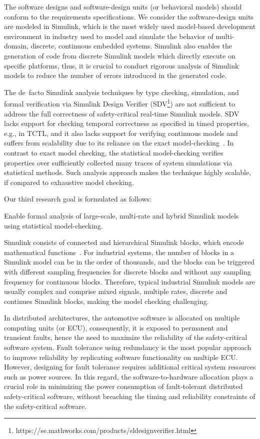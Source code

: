 The software designs and software-design units (or behavioral models) should conform to the requirements specifications. We consider the software-design units are modeled in Simulink, which is the most widely used model-based development environment in industry used to model and simulate the behavior of multi-domain, discrete, continuous embedded systems. Simulink also enables the generation of code from discrete Simulink models which directly execute on specific platforms, thus, it is crucial to conduct rigorous analysis of Simulink models to reduce the number of errors introduced in the generated code.

The de~facto Simulink analysis techniques by type checking, simulation, and formal verification via Simulink Design Verifier (SDV\footnote{https://se.mathworks.com/products/sldesignverifier.html}) are not sufficient to address the full correctness of safety-critical real-time Simulink models. SDV lacks support for checking temporal correctness as specified in timed properties, e.g., in TCTL, and it also lacks support for verifying continuous models and suffers from scalability due to its reliance on the exact model-checking~\cite{Leitner2008SimulinkStudy}. In contrast to exact model checking, the statistical model-checking verifies properties over sufficiently collected many traces of system simulations via statistical methods. Such analysis approach makes the technique highly scalable, if compared to exhaustive model checking.  

Our third research goal is formulated as follows:
\begin{researchgoal}
Enable formal analysis of large-scale, multi-rate and hybrid Simulink models using statistical model-checking.
\end{researchgoal}

Simulink consists of connected and hierarchical Simulink blocks, which encode mathematical functions~\cite{JamesB.Dabney2003MasteringSimulink}. For industrial systems, the number of blocks in a Simulink model can be in the order of thousands, and the blocks can be triggered with different sampling frequencies for discrete blocks and without any sampling frequency 
for continuous blocks. Therefore, typical industrial Simulink models are usually complex and comprise mixed signals, multiple rates, discrete and continues Simulink blocks, making the model checking challenging.

In distributed architectures, the automotive software is allocated on multiple computing units (or ECU), consequently, it is exposed to permanent and transient faults, hence the need to maximize the reliability of the safety-critical software system. Fault tolerance using redundancy is the most popular approach to improve reliability by replicating software functionality on multiple ECU. However, designing for fault tolerance requires additional critical system resources such as power sources. In this regard, the software-to-hardware allocation plays a crucial role in minimizing the power consumption of fault-tolerant distributed safety-critical software, without breaching the timing and reliability constraints of the safety-critical software.

